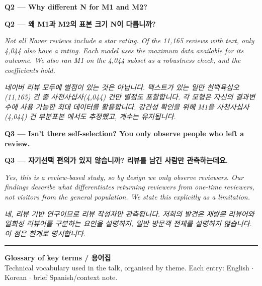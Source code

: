 \documentclass[10pt,a4paper]{article}
\newcommand{\sent}[1]{#1\\[4pt]}
\newcommand{\bilingual}[2]{%
  \noindent%
  \begin{minipage}[t]{0.485\linewidth}
    \small #1
  \end{minipage}\hfill\vrule\hfill%
  \begin{minipage}[t]{0.483\linewidth}
    \small #2
  \end{minipage}\par\vspace{3pt}%
}
\begin{document}
\noindent\textbf{Q2 --- Why different N for M1 and M2?}

\noindent\textbf{Q2 --- 왜 M1과 M2의 표본 크기 N이 다릅니까?}

\vspace{3pt}

\bilingual{%
\sent{\textit{Not all Naver reviews include a star rating. Of the 11,165
reviews with text, only 4,044 also have a rating. Each model uses the
maximum data available for its outcome. We also ran M1 on the 4,044
subset as a robustness check, and the coefficients hold.}}
}{%
\sent{\textit{네이버 리뷰 모두에 별점이 있는 것은 아닙니다. 텍스트가
있는 일만 천백육십오(11{,}165) 건 중 사천사십사(4{,}044) 건만 별점도
포함합니다. 각 모형은 자신의 결과변수에 사용 가능한 최대 데이터를
활용합니다. 강건성 확인을 위해 M1을 사천사십사(4{,}044) 건 부분표본
에서도 추정했고, 계수는 유지됩니다.}}
}

\vspace{8pt}

\noindent\textbf{Q3 --- Isn't there self-selection? You only observe people
who left a review.}

\noindent\textbf{Q3 --- 자기선택 편의가 있지 않습니까? 리뷰를 남긴 사람만
관측하는데요.}

\vspace{3pt}

\bilingual{%
\sent{\textit{Yes, this is a review-based study, so by design we only
observe reviewers. Our findings describe what differentiates returning
reviewers from one-time reviewers, not visitors from the general
population. We state this explicitly as a limitation.}}
}{%
\sent{\textit{네, 리뷰 기반 연구이므로 리뷰 작성자만 관측됩니다. 저희의
발견은 재방문 리뷰어와 일회성 리뷰어를 구분하는 요인을 설명하지, 일반
방문객 전체를 설명하지 않습니다. 이 점은 한계로 명시합니다.}}
}

\vspace{10pt}
\noindent\rule{\linewidth}{0.5pt}

\clearpage

\begin{center}
  {\large\bfseries Glossary of key terms / 용어집}\\[4pt]
  {\small Technical vocabulary used in the talk, organised by theme.
  Each entry: English $\cdot$ Korean $\cdot$ brief Spanish/context note.}
\end{center}
\end{document}
